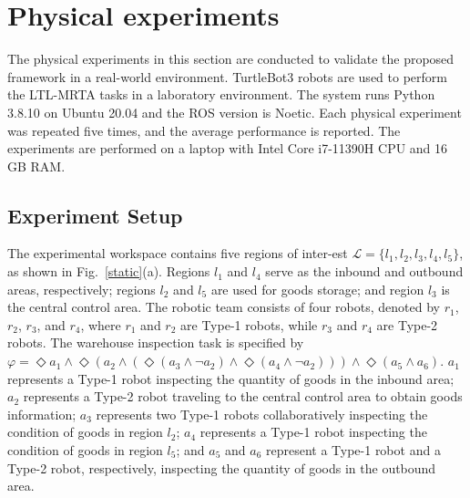 \documentclass[lettersize,journal]{IEEEtran}
\theoremstyle{italiclemma}
\theoremstyle{italiclemma}
\theoremstyle{definition}
\begin{document}


\section{Physical experiments}
\label{sec:physical_experiments}
The physical experiments in this section are conducted to validate the proposed framework in a real-world environment. TurtleBot3 robots\cite{8675050} are used to perform the LTL-MRTA tasks in a laboratory environment. The system runs Python 3.8.10 on Ubuntu 20.04 and the ROS\cite{Quigley2009ROS} version is Noetic. Each physical experiment was repeated five times, and the average performance is reported. The experiments are performed on a laptop with Intel Core i7-11390H CPU and 16 GB RAM.

\subsection{Experiment Setup}
The experimental workspace contains five regions of inter-est $\mathcal{L} = \{l_1, l_2, l_3, l_4, l_5\}$, as shown in Fig.~\ref{static}(a). Regions $l_1$ and $l_4$ serve as the inbound and outbound areas, respectively; regions $l_2$ and $l_5$ are used for goods storage; and region $l_3$ is the central control area.  The robotic team consists of four robots, denoted by $r_1$, $r_2$, $r_3$, and $r_4$, where $r_1$ and $r_2$ are Type-1 robots, while $r_3$ and $r_4$ are Type-2 robots. The warehouse inspection task is specified by $\varphi= \Diamond a_1 \land \Diamond \left( a_2 \land \left( \Diamond (a_3 \land \neg a_2) \land \Diamond (a_4 \land \neg a_2 ) \right) \right) \land \Diamond \left(a_5 \land a_6\right).$ $a_1$ represents a Type-1 robot inspecting the quantity of goods in the inbound area;  $a_2$ represents a Type-2 robot traveling to the central control area to obtain goods information;  $a_3$ represents two Type-1 robots collaboratively inspecting the condition of goods in region $l_2$;  $a_4$ represents a Type-1 robot inspecting the condition of goods in region $l_5$;  and $a_5$ and $a_6$ represent a Type-1 robot and a Type-2 robot, respectively, inspecting the quantity of goods in the outbound area.
\end{document}
